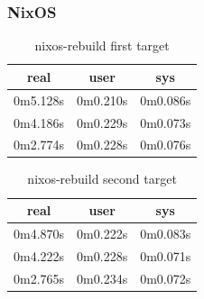 \documentclass[10pt,]{report}
\begin{document}
\begin{adjustwidth}{20pt}{}
	\subsubsection{NixOS}
	\begin{table}[H]
		\caption{nixos-rebuild first target}
		\begin{center}
			\begin{tabular}[c]{|c|c|c|}
				\hline
				\multicolumn{1}{|c|}{\textbf{real}} &
				\multicolumn{1}{c|}{\textbf{user}}  &
				\multicolumn{1}{c|}{\textbf{sys}}                         \\
				\hline
				0m5.128s                            & 0m0.210s & 0m0.086s \\
				\hline
				0m4.186s                            & 0m0.229s & 0m0.073s \\
				\hline
				0m2.774s                            & 0m0.228s & 0m0.076s \\
				\hline
			\end{tabular}
		\end{center}
	\end{table}
	\vspace{-5mm}
	\begin{table}[H]
		\caption{nixos-rebuild second target}
		\begin{center}
			\begin{tabular}[c]{|c|c|c|}
				\hline
				\multicolumn{1}{|c|}{\textbf{real}} &
				\multicolumn{1}{c|}{\textbf{user}}  &
				\multicolumn{1}{c|}{\textbf{sys}}                         \\
				\hline
				0m4.870s                            & 0m0.222s & 0m0.083s \\
				\hline
				0m4.222s                            & 0m0.228s & 0m0.071s \\
				\hline
				0m2.765s                            & 0m0.234s & 0m0.072s \\
				\hline
			\end{tabular}
		\end{center}
	\end{table}

\end{adjustwidth}
\end{document}
